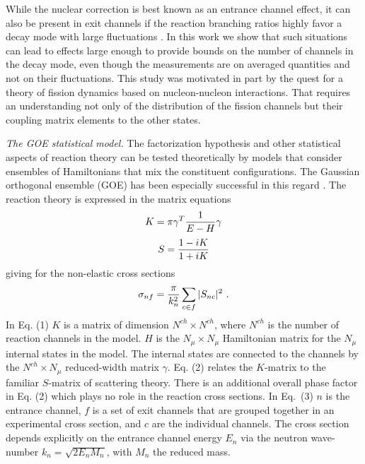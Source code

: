 \documentclass[prl,aps,floatfix,nofootinbib,preprint]{revtex4}
\def\be{\begin{equation}}
\def\ee{\end{equation}}
\begin{document}
While the nuclear correction is best known as an entrance channel effect,
it can also be present in exit channels if the reaction branching ratios
highly favor a decay mode with large fluctuations \cite{mo76}. 
In this work we show that such situations can lead to effects large enough
to provide bounds on the number of channels in the decay mode, even though
the measurements are on averaged quantities and not on their fluctuations.
This study was motivated in part by the quest for a theory of
fission dynamics based on nucleon-nucleon interactions.  That requires
an understanding not only of the distribution of the fission
channels but their coupling matrix elements to the other states.

{\it The GOE statistical model.}
The factorization hypothesis and other statistical aspects of reaction
theory  can be tested theoretically by models that consider ensembles of 
Hamiltonians that  mix the constituent 
configurations. The Gaussian orthogonal ensemble (GOE) has been especially
successful in this regard \cite{ka15,mi10}.  The reaction theory is
expressed in the matrix equations
\be
K = \pi { \gamma}^T {1\over E - H} { \gamma}
\ee 
\be
S = {1 -i  K \over 1 +i  K} 
\ee
giving for the non-elastic cross sections \cite{statistical}
\be
\sigma_{nf} = {\pi\over k_n^2} \sum_{c \in f} |S_{n c}|^2 \ .
\ee
In Eq. (1) $K$ is a matrix of dimension $N^{ch}\times N^{ch}$, where $N^{ch}$ is 
the number of reaction channels in the model. $H$ is the $N_\mu\times
N_\mu$ Hamiltonian matrix for the $N_\mu$ internal states 
in the model. The internal states are connected to the channels by the
$N^{ch} \times N_\mu$ reduced-width matrix $ \gamma$.
Eq. (2) relates the $K$-matrix
to the familiar $S$-matrix of scattering theory. There is an additional
overall phase factor in Eq. (2) which plays no role in the reaction
cross sections.  In Eq.~(3) 
 $n$ is the entrance channel, $f$ is a set of exit
channels that are grouped together in an experimental cross section, and $c$ are
the individual channels. The cross section depends explicitly on
the entrance channel energy $E_n$ via { the neutron wave-number} $k_n = \sqrt{2 E_n M_n}$, with $M_n$ 
the reduced mass.
\end{document}
